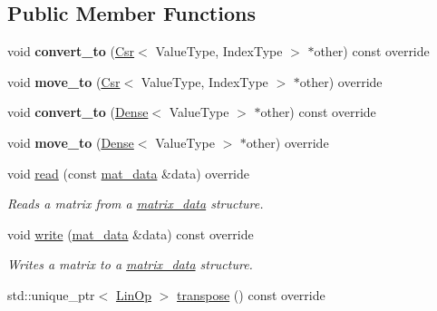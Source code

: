 \subsection*{Public Member Functions}
\begin{DoxyCompactItemize}
\item 
\mbox{\label{classgko_1_1matrix_1_1Coo_a209277e9e7c7fe02c810524f758b96e0}} 
void {\bfseries convert\+\_\+to} (\hyperlink{classgko_1_1matrix_1_1Csr}{Csr}$<$ Value\+Type, Index\+Type $>$ $\ast$other) const override
\item 
\mbox{\label{classgko_1_1matrix_1_1Coo_a69d13086e01d54027191308f01fe7853}} 
void {\bfseries move\+\_\+to} (\hyperlink{classgko_1_1matrix_1_1Csr}{Csr}$<$ Value\+Type, Index\+Type $>$ $\ast$other) override
\item 
\mbox{\label{classgko_1_1matrix_1_1Coo_afe1da5bbb43e64ced415d90b68e5d87d}} 
void {\bfseries convert\+\_\+to} (\hyperlink{classgko_1_1matrix_1_1Dense}{Dense}$<$ Value\+Type $>$ $\ast$other) const override
\item 
\mbox{\label{classgko_1_1matrix_1_1Coo_a0c4d89bb25548925ca9e698bdf00a946}} 
void {\bfseries move\+\_\+to} (\hyperlink{classgko_1_1matrix_1_1Dense}{Dense}$<$ Value\+Type $>$ $\ast$other) override
\item 
void \hyperlink{classgko_1_1matrix_1_1Coo_ac0d4aeb19d9f55b62bea18bad1a408f5}{read} (const \hyperlink{structgko_1_1matrix__data}{mat\+\_\+data} \&data) override
\begin{DoxyCompactList}\small\item\em Reads a matrix from a \hyperlink{structgko_1_1matrix__data}{matrix\+\_\+data} structure. \end{DoxyCompactList}\item 
void \hyperlink{classgko_1_1matrix_1_1Coo_ae193466ca1a4a3c7d1383ddc5a2701ab}{write} (\hyperlink{structgko_1_1matrix__data}{mat\+\_\+data} \&data) const override
\begin{DoxyCompactList}\small\item\em Writes a matrix to a \hyperlink{structgko_1_1matrix__data}{matrix\+\_\+data} structure. \end{DoxyCompactList}\item 
std\+::unique\+\_\+ptr$<$ \hyperlink{classgko_1_1LinOp}{Lin\+Op} $>$ \hyperlink{classgko_1_1matrix_1_1Coo_ae6533c08c7f818d3bdd80b2871784dab}{transpose} () const override

\end{DoxyCompactItemize}
